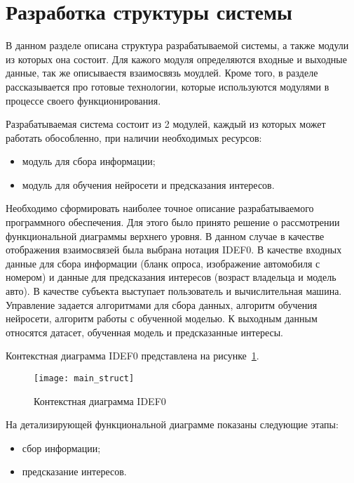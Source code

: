 \newpage

\section{Разработка структуры системы}

В данном разделе описана структура разрабатываемой системы, а также модули из которых она состоит. Для кажого модуля определяются входные и выходные данные, так же описываестя взаимосвязь моудлей. Кроме того, в разделе рассказывается про готовые технологии, которые используются модулями в процессе своего функционирования.

Разрабатываемая система состоит из 2 модулей, каждый из которых может работать обособленно, при наличии необходимых ресурсов:

\begin{itemize}
	\item модуль для сбора информации;
	\item модуль для обучения нейросети и предсказания интересов.
\end{itemize}

Необходимо сформировать наиболее точное описание разрабатываемого программного обеспечения. Для этого было принято решение о рассмотрении функциональной диаграммы верхнего уровня.
В данном случае в качестве отображения взаимосвязей была выбрана нотация IDEF0. В качестве входных данные для сбора информации (бланк опроса, изображение автомобиля с номером) и данные для предсказания интересов (возраст владельца и модель авто). В качестве субъекта выступает пользователь и вычислительная машина. Управление задается алгоритмами для сбора данных, алгоритм обучения нейросети, алгоритм работы с обученной моделью. К выходным данным относятся датасет, обученная модель и предсказанные интересы.

Контекстная диаграмма IDEF0 представлена на рисунке~\ref{f:main_struct}.

\begin{figure}[h]
	\centering
	\vspace{\toppaddingoffigure}
	\texttt{[image: main\_struct]}
	\caption{Контекстная диаграмма IDEF0}
	\label{f:main_struct}
\end{figure}

На детализирующей функциональной диаграмме показаны следующие этапы:

\begin{itemize}
	\item сбор информации;
	\item предсказание интересов.
\end{itemize}

